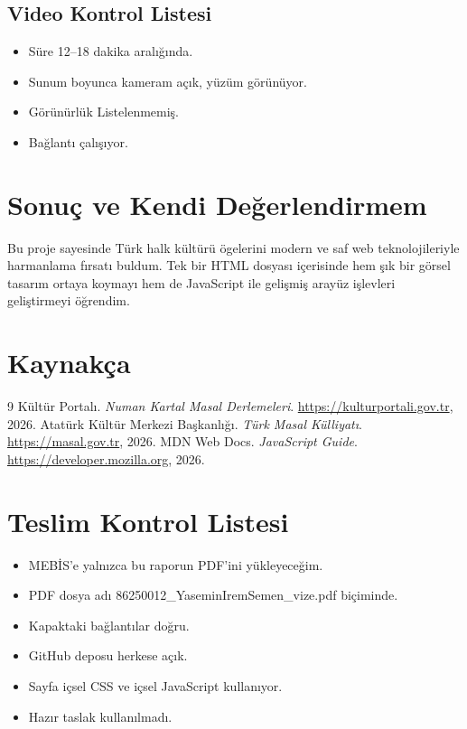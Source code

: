 \documentclass[12pt,a4paper]{article}
\begin{document}
\subsection{Video Kontrol Listesi}
\begin{itemize}
  \item Süre 12--18 dakika aralığında.
  \item Sunum boyunca kameram açık, yüzüm görünüyor.
  \item Görünürlük Listelenmemiş.
  \item Bağlantı çalışıyor.
\end{itemize}

\section{Sonuç ve Kendi Değerlendirmem}
Bu proje sayesinde Türk halk kültürü ögelerini modern ve saf web teknolojileriyle harmanlama fırsatı buldum. Tek bir HTML dosyası içerisinde hem şık bir görsel tasarım ortaya koymayı hem de JavaScript ile gelişmiş arayüz işlevleri geliştirmeyi öğrendim.

\section{Kaynakça}
\begin{thebibliography}{9}
 Kültür Portalı. \emph{Numan Kartal Masal Derlemeleri}. \url{https://kulturportali.gov.tr}, 2026.
 Atatürk Kültür Merkezi Başkanlığı. \emph{Türk Masal Külliyatı}. \url{https://masal.gov.tr}, 2026.
 MDN Web Docs. \emph{JavaScript Guide}. \url{https://developer.mozilla.org}, 2026.
\end{thebibliography}

\appendix
\section{Teslim Kontrol Listesi}
\begin{itemize}
  \item MEBİS'e yalnızca bu raporun PDF'ini yükleyeceğim.
  \item PDF dosya adı 86250012\_YaseminIremSemen\_vize.pdf biçiminde.
  \item Kapaktaki bağlantılar doğru.
  \item GitHub deposu herkese açık.
  \item Sayfa içsel CSS ve içsel JavaScript kullanıyor.
  \item Hazır taslak kullanılmadı.
\end{itemize}
\end{document}
